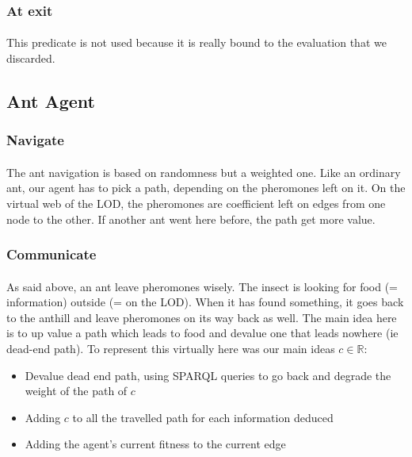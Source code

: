 \documentclass{article}
\newenvironment{itemh}[0]{\begin{itemize}[font=\color{mygray} \small]}{\end{itemize}}
\begin{document}
		\subsubsection{At exit}
			\paragraph{}
				This predicate is not used because it is really bound to the evaluation that we discarded.
	\subsection{Ant Agent}
		\subsubsection{Navigate}
			\paragraph{}
				The ant navigation is based on randomness but a weighted one.
				Like an ordinary ant, our agent has to pick a path, depending on the pheromones left on it.
				On the virtual web of the LOD, the pheromones are coefficient left on edges from one node to the other.
				If another ant went here before, the path get more value.
		\subsubsection{Communicate}
			\paragraph{}
				As said above, an ant leave pheromones wisely.
				The insect is looking for food (= information) outside (= on the LOD).
				When it has found something, it goes back to the anthill and leave pheromones on its way back as well.
				The main idea here is to up value a path which leads to food and devalue one that leads nowhere (ie dead-end path).
				To represent this virtually here was our main ideas $c \in \mathbb{R}$:
			\begin{itemh}
			\item Devalue dead end path, using SPARQL queries to go back and degrade the weight of the path of $c$
			\item Adding $c$ to all the travelled path for each information deduced
			\item Adding the agent's current fitness to the current edge
			\end{itemh}
\end{document}
